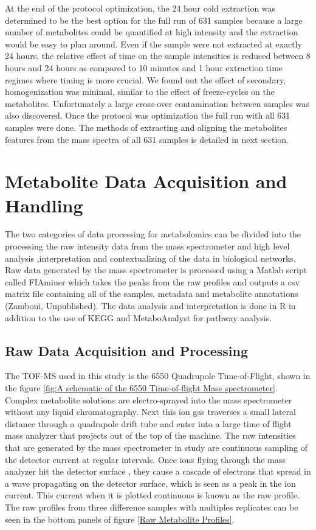 \documentclass[a4paper,11pt,twoside]{book}
\begin{document}
	At the end of the protocol optimization, the 24 hour cold extraction was determined to be the best option for the full run of 631 samples because a large number of metabolites could be quantified at high intensity and the extraction would be easy to plan around. Even if the sample were not extracted at exactly 24 hours, the relative effect of time on the sample intensities is reduced between 8 hours and 24 hours as compared to 10 minutes and 1 hour extraction time regimes where timing is more crucial. We found out the effect of secondary, homogenization was minimal, similar to the effect of freeze-cycles on the metabolites. Unfortunately a large cross-over contamination between samples was also discovered. Once the protocol was optimization the full run with all 631 samples were done. The methods of extracting and aligning the metabolites features from the mass spectra of all 631 samples is detailed in next section.
	
	\clearpage
	\section{Metabolite Data Acquisition and Handling}
	
	The two categories of data processing for metabolomics can be divided into the processing the raw intensity data from the mass spectrometer and high level analysis ,interpretation and contextualizing of the data in biological networks. Raw data generated by the mass spectrometer is processed using a Matlab script called FIAminer which takes the peaks from the raw profiles and outputs a csv matrix file containing all of the samples, metadata and metabolite annotations (Zamboni, Unpublished). The data analysis and interpretation is done in R in addition to the use of KEGG \citep{Kanehisa2017} and MetaboAnalyst\citep{Xia2016UsingAnalysis} for pathway analysis.
	
	\subsection{Raw Data Acquisition and Processing}
	
	The TOF-MS used in this study is the 6550 Quadrupole Time-of-Flight, shown in the figure \ref{fig:A schematic of the 6550 Time-of-flight Mass spectrometer}. Complex metabolite solutions are electro-sprayed into the mass spectrometer without any liquid chromatography. Next this ion gas traverses a small lateral distance through a quadrapole drift tube and enter into a large time of flight mass analyzer that projects out of the top of the machine. The raw intensities that are generated by the mass spectrometer in study are continuous sampling of the detector current at regular intervals. Once ions flying through the mass analyzer hit the detector surface \citep{Glish2003TheCentury}, they cause a cascade of electrons that spread in a wave propagating on the detector surface, which is seen as a peak in the ion current. This current when it is plotted continuous is known as the raw profile. The raw profiles from three difference samples with multiples replicates can be seen in the bottom panels of figure \ref{Raw Metabolite Profiles}. 
	
\end{document}
